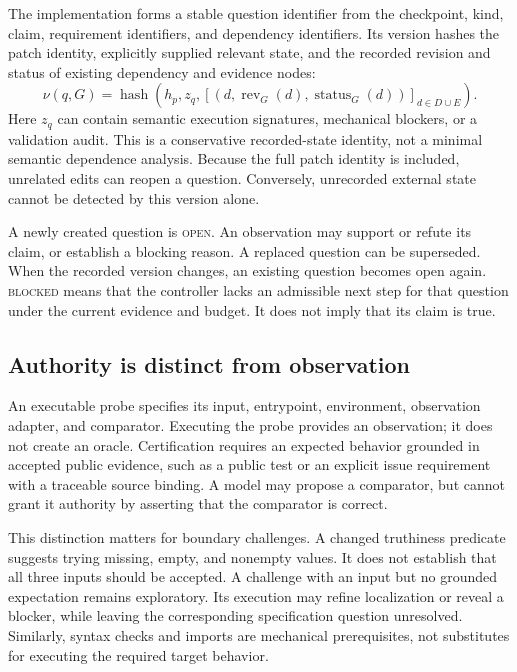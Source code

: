 \documentclass[acmsmall,screen,review,anonymous]{acmart}
\newcommand{\open}{\textsc{open}}
\newcommand{\blocked}{\textsc{blocked}}
\newcommand{\hash}{\operatorname{hash}}
\newcommand{\status}{\operatorname{status}}
\begin{document}
The implementation forms a stable question identifier from the checkpoint, kind, claim, requirement identifiers, and dependency identifiers. Its version hashes the patch identity, explicitly supplied relevant state, and the recorded revision and status of existing dependency and evidence nodes:
\begin{equation}
 \nu(q,G)=\hash\!\left(h_p,z_q,
       [(d,\operatorname{rev}_G(d),\status_G(d))]_{d\in D\cup E}\right).
 \label{eq:version}
\end{equation}
Here $z_q$ can contain semantic execution signatures, mechanical blockers, or a validation audit. This is a conservative recorded-state identity, not a minimal semantic dependence analysis. Because the full patch identity is included, unrelated edits can reopen a question. Conversely, unrecorded external state cannot be detected by this version alone.

A newly created question is \open. An observation may support or refute its claim, or establish a blocking reason. A replaced question can be superseded. When the recorded version changes, an existing question becomes open again. \blocked{} means that the controller lacks an admissible next step for that question under the current evidence and budget. It does not imply that its claim is true.

\subsection{Authority is distinct from observation}
An executable probe specifies its input, entrypoint, environment, observation adapter, and comparator. Executing the probe provides an observation; it does not create an oracle. Certification requires an expected behavior grounded in accepted public evidence, such as a public test or an explicit issue requirement with a traceable source binding. A model may propose a comparator, but cannot grant it authority by asserting that the comparator is correct.

This distinction matters for boundary challenges. A changed truthiness predicate suggests trying missing, empty, and nonempty values. It does not establish that all three inputs should be accepted. A challenge with an input but no grounded expectation remains exploratory. Its execution may refine localization or reveal a blocker, while leaving the corresponding specification question unresolved. Similarly, syntax checks and imports are mechanical prerequisites, not substitutes for executing the required target behavior.
\end{document}
